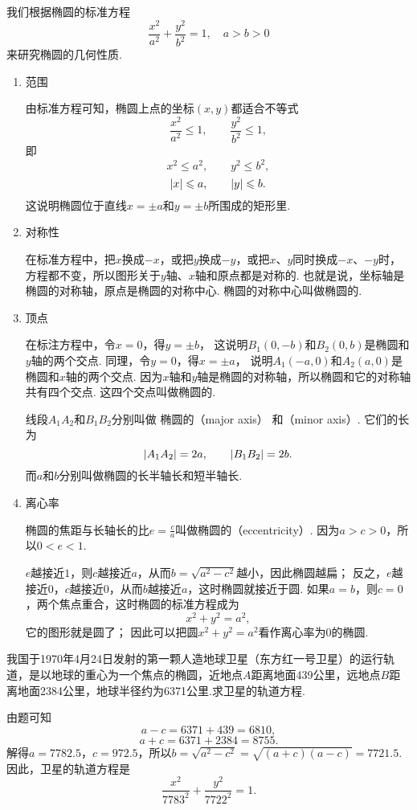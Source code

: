 我们根据椭圆的标准方程\[
	\frac{x^2}{a^2} + \frac{y^2}{b^2} = 1,
	\quad a > b > 0
\]来研究椭圆的几何性质.
\begin{enumerate}
\item 范围

由标准方程可知，椭圆上点的坐标\((x,y)\)都适合不等式\[
\frac{x^2}{a^2} \leqslant 1, \qquad \frac{y^2}{b^2} \leqslant 1,
\]即\[
x^2 \leqslant a^2, \qquad y^2 \leqslant b^2,
\]\[
\abs{x} \leqslant a, \qquad \abs{y} \leqslant b.
\]这说明椭圆位于直线\(x=\pm a\)和\(y=\pm b\)所围成的矩形里.

\item 对称性

在标准方程中，把\(x\)换成\(-x\)，或把\(y\)换成\(-y\)，或把\(x\)、\(y\)同时换成\(-x\)、\(-y\)时，%
方程都不变，所以图形关于\(y\)轴、\(x\)轴和原点都是对称的.
也就是说，坐标轴是椭圆的对称轴，原点是椭圆的对称中心.
椭圆的对称中心叫做椭圆的.

\item 顶点

在标注方程中，令\(x=0\)，得\(y=\pm b\)，%
这说明\(B_1(0,-b)\)和\(B_2(0,b)\)是椭圆和\(y\)轴的两个交点.
同理，令\(y=0\)，得\(x=\pm a\)，%
说明\(A_1(-a,0)\)和\(A_2(a,0)\)是椭圆和\(x\)轴的两个交点.
因为\(x\)轴和\(y\)轴是椭圆的对称轴，所以椭圆和它的对称轴共有四个交点.
这四个交点叫做椭圆的.

线段\(A_1 A_2\)和\(B_1 B_2\)分别叫做%
椭圆的（major axis）%
和（minor axis）.
它们的长为\[
\abs{A_1 A_2} = 2a, \qquad \abs{B_1 B_2} = 2b.
\]而\(a\)和\(b\)分别叫做椭圆的长半轴长和短半轴长.

\item 离心率

椭圆的焦距与长轴长的比\(e = \frac{c}{a}\)叫做椭圆的（eccentricity）.
因为\(a > c > 0\)，所以\(0 < e < 1\).

\(e\)越接近\(1\)，则\(c\)越接近\(a\)，从而\(b = \sqrt{a^2 - c^2}\)越小，因此椭圆越扁；
反之，\(e\)越接近\(0\)，\(c\)越接近\(0\)，从而\(b\)越接近\(a\)，这时椭圆就接近于圆.
如果\(a=b\)，则\(c=0\)，两个焦点重合，这时椭圆的标准方程成为\[
x^2 + y^2 = a^2,
\]
它的图形就是圆了；
因此可以把圆\(x^2+y^2=a^2\)看作离心率为\(0\)的椭圆.
\end{enumerate}

\begin{example}
我国于1970年4月24日发射的第一颗人造地球卫星（东方红一号卫星）的运行轨道，是以地球的重心为一个焦点的椭圆，近地点\(A\)距离地面439公里，远地点\(B\)距离地面2384公里，地球半径约为6371公里.求卫星的轨道方程.
\begin{solution}
由题可知\[
a - c = 6371 + 439 = 6810,
\]\[
a + c = 6371 + 2384 = 8755.
\]解得\(a=7782.5\)，\(c=972.5\)，所以\(b=\sqrt{a^2-c^2}=\sqrt{(a+c)(a-c)}=7721.5\).因此，卫星的轨道方程是\[
\frac{x^2}{7783^2}+\frac{y^2}{7722^2}=1.
\]
\end{solution}
\end{example}

